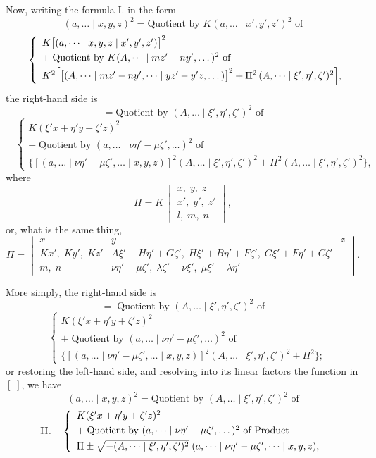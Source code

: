 \documentclass[11pt]{article}
\begin{document}
Now, writing the formula \textsc{I.} in the form
\[ (a,\dots \mid x,y,z)^{2}=\text{Quotient by }K(a,\dots \mid x',y',z')^{2}\text{ of} \]
\[ \quad\left\{\begin{array}{l}
K\bigl[(a,\dots \mid x,y,z \mid x',y',z')\bigr]^{2}\\[0.3em]
+\;\text{Quotient by }K(A,\dots \mid mz'-ny',\dots)^{2}\text{ of}\\[0.3em]
K^{2}\Bigl[\bigl[(A,\dots \mid mz'-ny',\dots \mid yz'-y'z,\dots)\bigr]^{2}+\Pi^{2}\,(A,\dots \mid \xi',\eta',\zeta')^{2}\Bigr],
\end{array}\right. \]
the right-hand side is
\[ = \text{Quotient by }(A,\dots \mid \xi',\eta',\zeta')^{2}\text{ of} \]
\[ \quad\left\{\begin{array}{l}
K(\xi' x+\eta' y+\zeta' z)^{2}\\[0.3em]
+\;\text{Quotient by }(a,\dots \mid \nu\eta'-\mu\zeta',\dots)^{2}\text{ of}\\[0.3em]
\bigl\{[(a,\dots \mid \nu\eta'-\mu\zeta',\dots \mid x,y,z)]^{2}(A,\dots \mid \xi',\eta',\zeta')^{2}+\Pi^{2}(A,\dots \mid \xi',\eta',\zeta')^{2}\bigr\},
\end{array}\right. \]
where
\[ \Pi = K\,\begin{vmatrix} x,\;y,\;z\\ x',\;y',\;z'\\ l,\;m,\;n\end{vmatrix}, \]
or, what is the same thing,
\[ \Pi=\begin{vmatrix}
x & y & z\\
Kx',\;Ky',\;Kz' & A\xi'+H\eta'+G\zeta',\;H\xi'+B\eta'+F\zeta',\;G\xi'+F\eta'+C\zeta'\\
m,\;n & \nu\eta'-\mu\zeta',\;\lambda\zeta'-\nu\xi',\;\mu\xi'-\lambda\eta'
\end{vmatrix}. \]

More simply, the right-hand side is
\[ =\;\text{Quotient by }(A,\dots \mid \xi',\eta',\zeta')^{2}\text{ of} \]
\[ \quad\left\{\begin{array}{l}
K(\xi' x+\eta' y+\zeta' z)^{2}\\[0.3em]
+\;\text{Quotient by }(a,\dots \mid \nu\eta'-\mu\zeta',\dots)^{2}\text{ of}\\[0.3em]
\bigl\{[(a,\dots \mid \nu\eta'-\mu\zeta',\dots \mid x,y,z)]^{2}(A,\dots \mid \xi',\eta',\zeta')^{2}+\Pi^{2}\bigr\};
\end{array}\right. \]
or restoring the left-hand side, and resolving into its linear factors the function in
$[\;]$, we have
\[ (a,\dots \mid x,y,z)^{2}=\text{Quotient by }(A,\dots \mid \xi',\eta',\zeta')^{2}\text{ of} \]
\[ \textsc{II.}\quad\left\{\begin{array}{l}
K(\xi' x+\eta' y+\zeta' z)^{2}\\[0.3em]
+\;\text{Quotient by }(a,\dots \mid \nu\eta'-\mu\zeta',\dots)^{2}\text{ of Product}\\[0.3em]
\Pi\pm\sqrt{-(A,\dots \mid \xi',\eta',\zeta')^{2}}\;(a,\dots \mid \nu\eta'-\mu\zeta',\dots \mid x,y,z),
\end{array}\right. \]
\end{document}
